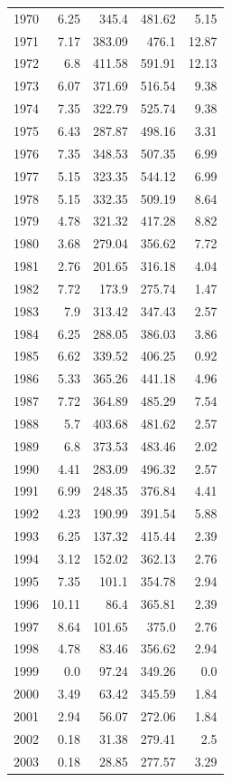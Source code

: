 \documentclass[a4paper]{article}
\begin{document}
\begin{longtable}{rrrrr}
1970 & 6.25 & 345.4 & 481.62 & 5.15\\
1971 & 7.17 & 383.09 & 476.1 & 12.87\\
1972 & 6.8 & 411.58 & 591.91 & 12.13\\
1973 & 6.07 & 371.69 & 516.54 & 9.38\\
1974 & 7.35 & 322.79 & 525.74 & 9.38\\
1975 & 6.43 & 287.87 & 498.16 & 3.31\\
1976 & 7.35 & 348.53 & 507.35 & 6.99\\
1977 & 5.15 & 323.35 & 544.12 & 6.99\\
1978 & 5.15 & 332.35 & 509.19 & 8.64\\
1979 & 4.78 & 321.32 & 417.28 & 8.82\\
1980 & 3.68 & 279.04 & 356.62 & 7.72\\
1981 & 2.76 & 201.65 & 316.18 & 4.04\\
1982 & 7.72 & 173.9 & 275.74 & 1.47\\
1983 & 7.9 & 313.42 & 347.43 & 2.57\\
1984 & 6.25 & 288.05 & 386.03 & 3.86\\
1985 & 6.62 & 339.52 & 406.25 & 0.92\\
1986 & 5.33 & 365.26 & 441.18 & 4.96\\
1987 & 7.72 & 364.89 & 485.29 & 7.54\\
1988 & 5.7 & 403.68 & 481.62 & 2.57\\
1989 & 6.8 & 373.53 & 483.46 & 2.02\\
1990 & 4.41 & 283.09 & 496.32 & 2.57\\
1991 & 6.99 & 248.35 & 376.84 & 4.41\\
1992 & 4.23 & 190.99 & 391.54 & 5.88\\
1993 & 6.25 & 137.32 & 415.44 & 2.39\\
1994 & 3.12 & 152.02 & 362.13 & 2.76\\
1995 & 7.35 & 101.1 & 354.78 & 2.94\\
1996 & 10.11 & 86.4 & 365.81 & 2.39\\
1997 & 8.64 & 101.65 & 375.0 & 2.76\\
1998 & 4.78 & 83.46 & 356.62 & 2.94\\
1999 & 0.0 & 97.24 & 349.26 & 0.0\\
2000 & 3.49 & 63.42 & 345.59 & 1.84\\
2001 & 2.94 & 56.07 & 272.06 & 1.84\\
2002 & 0.18 & 31.38 & 279.41 & 2.5\\
2003 & 0.18 & 28.85 & 277.57 & 3.29\\

\end{longtable}
\end{document}
